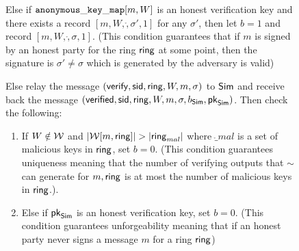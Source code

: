 \begin{figure}
\begin{tcolorbox}[left=2pt,right=2pt]
{\begin{list}{\hspace*{1pt} C}{\setlength\leftmargin{0.15in}}
				\label{cond:consistency}
				\item Else if $ \mathtt{anonymous\_key\_map}[m,W]  $ is an honest verification key and  there exists a record $ [m, W,\ring, \sigma', 1] $ for any $ \sigma' $, then let $ b=1 $ and record $ [m, W,\ring,\sigma, 1] $. (This condition guarantees that if $ m $ is signed by an honest party for the ring $ \mathsf{ring} $ at some point, then the signature is $ \sigma' \neq \sigma $ which is generated by the adversary is valid) \label{cond:differentsignature}
				
				\item \label{cond:malicioussignature}Else relay the message $(\mathsf{verify}, \textsf{sid}, \mathsf{ring},W, m, \sigma)$ to $ \mathsf{Sim} $ and receive back the message $(\mathsf{verified}, \textsf{sid}, \mathsf{ring},W, m, \sigma, b_{\mathsf{Sim}}, \mathsf{pk}_{\mathsf{Sim}})$.  Then check the following:

				\begin{enumerate}
					\item If $ W \notin \mathcal{W} $ and $ |\mathcal{W}[m, \mathsf{ring}]| > |\mathsf{ring}_{mal}| $ where $ \ring_{mal} $ is a set of malicious keys in $ \mathsf{ring} $, set $ b = 0 $.
					(This condition guarantees  uniqueness meaning that the number of verifying outputs that $ \sim $ can generate for $ m, \mathsf{ring} $ is at most the  number of malicious keys in $ \mathsf{ring} $.)\label{cond:uniqueness}.
					
					\item Else if $ \mathsf{pk}_{\mathsf{Sim}} $ is an honest verification key, set $ b = 0 $. (This condition guarantees unforgeability meaning that if an honest party never signs a message $ m $ for a ring $ \mathsf{ring} $)\label{cond:forgery}
					

\end{enumerate}
\end{list}}
\end{tcolorbox}
\end{figure}

